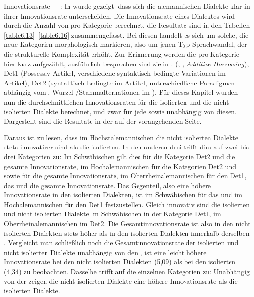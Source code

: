 {Innovationsrate + :} In  wurde gezeigt, dass sich die alemannischen Dialekte klar in ihrer Innovationsrate unterscheiden. Die Innovationsrate eines Dialektes wird durch die Anzahl von  pro Kategorie berechnet, die Resultate sind in den Tabellen \ref{table6.13}–\ref{table6.16} zusammengefasst. Bei diesen  handelt es sich um solche, die neue Kategorien morphologisch markieren, also um jenen Typ Sprachwandel, der die strukturelle Komplexität erhöht. Zur Erinnerung werden die  pro Kategorie hier kurz aufgezählt, ausführlich besprochen sind sie in :  (, , \textit{Additive Borrowing}), Det1 (Possessiv-Artikel, verschiedene syntaktisch bedingte Variationen im Artikel), Det2 (syntaktisch bedingte  im Artikel, unterschiedliche Paradigmen abhängig vom , Wur\-zel-/Stamm\-al\-ter\-na\-tio\-nen im ). Für dieses Kapitel wurden nun die durchschnittlichen Innovationsraten für die isolierten und die nicht isolierten Dialekte berechnet, und zwar für jede  sowie unabhängig von diesen. Dargestellt sind die Resultate in der  auf der vorangehenden Seite.

Daraus ist zu lesen, dass im Höchstalemannischen die nicht isolierten Dialekte stets innovativer sind als die isolierten. In den anderen drei  trifft dies auf zwei bis drei Kategorien zu: Im Schwäbischen gilt dies für die Kategorie Det2 und die gesamte Innovationsrate, im Hochalemannischen für die Kategorien Det2 und  sowie für die gesamte Innovationsrate, im Oberrheinalemannischen für den Det1, das  und die gesamte Innovationsrate. Das Gegenteil, also eine höhere Innovationsrate in den isolierten Dialekten, ist im Schwäbischen für das  und im Hochalemannischen für den Det1 festzustellen. Gleich innovativ sind die isolierten und nicht isolierten Dialekte im Schwäbischen in der Kategorie Det1, im Oberrheinalemannischen im Det2. Die Gesamtinnovationsrate ist also in den nicht isolierten Dialekten stets höher als in den isolierten Dialekten innerhalb derselben . Vergleicht man schließlich noch die Gesamtinnovationsrate der isolierten und nicht isolierten Dialekte unabhängig von den , ist eine leicht höhere Innovationsrate bei den nicht isolierten Dialekten (5,09) als bei den isolierten (4,34) zu beobachten. Dasselbe trifft auf die einzelnen Kategorien zu: Unabhängig von der  zeigen die nicht isolierten Dialekte eine höhere Innovationsrate als die isolierten Dialekte.

